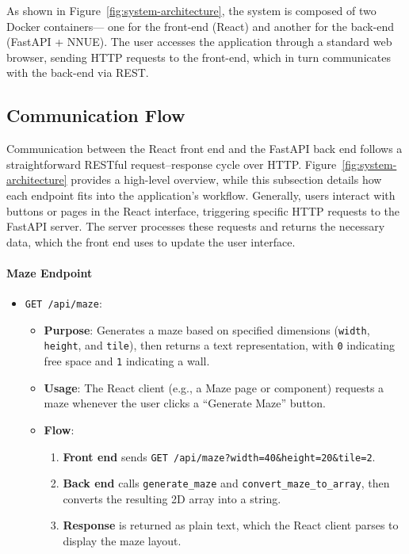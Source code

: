 \documentclass[12pt,a4paper]{article}
\begin{document}
As shown in Figure~\ref{fig:system-architecture}, the system is composed of two Docker containers—
one for the front-end (React) and another for the back-end (FastAPI + NNUE). The user accesses 
the application through a standard web browser, sending HTTP requests to the front-end, which 
in turn communicates with the back-end via REST.




\subsection{Communication Flow}
Communication between the React front end and the FastAPI back end follows a straightforward RESTful request--response cycle over HTTP. Figure~\ref{fig:system-architecture} provides a high-level overview, while this subsection details how each endpoint fits into the application's workflow. Generally, users interact with buttons or pages in the React interface, triggering specific HTTP requests to the FastAPI server. The server processes these requests and returns the necessary data, which the front end uses to update the user interface.

\paragraph{Maze Endpoint}
\begin{itemize}
  \item \texttt{GET /api/maze}:
    \begin{itemize}
      \item \textbf{Purpose}: Generates a maze based on specified dimensions (\texttt{width}, \texttt{height}, and \texttt{tile}), then returns a text representation, with \texttt{0} indicating free space and \texttt{1} indicating a wall.
      \item \textbf{Usage}: The React client (e.g., a Maze page or component) requests a maze whenever the user clicks a “Generate Maze” button.
      \item \textbf{Flow}:
        \begin{enumerate}
          \item \textbf{Front end} sends \texttt{GET /api/maze?width=40\&height=20\&tile=2}.
          \item \textbf{Back end} calls \texttt{generate\_maze} and \texttt{convert\_maze\_to\_array}, then converts the resulting 2D array into a string.
          \item \textbf{Response} is returned as plain text, which the React client parses to display the maze layout.
        \end{enumerate}
    \end{itemize}
\end{itemize}
\end{document}
